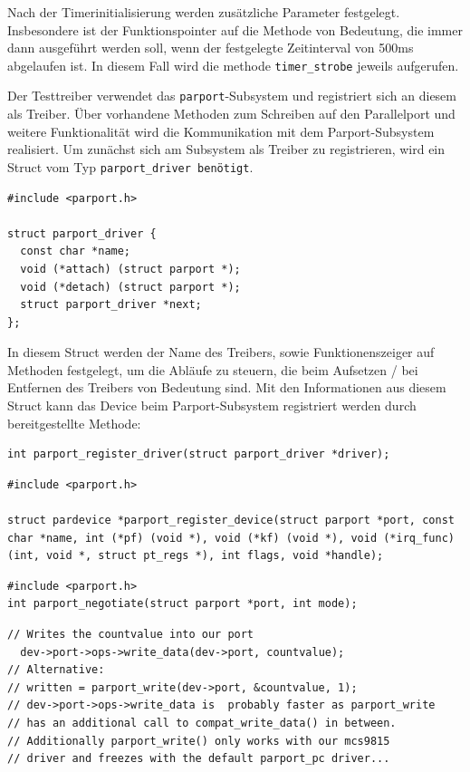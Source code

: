 \documentclass[a4paper,11pt]{article}
\begin{document}
Nach der Timerinitialisierung werden zusätzliche Parameter festgelegt. Insbesondere ist der Funktionspointer auf die Methode von Bedeutung, die immer dann ausgeführt werden soll, wenn der festgelegte Zeitinterval von 500ms abgelaufen ist. In diesem Fall wird die methode \verb|timer_strobe| jeweils aufgerufen.

Der Testtreiber verwendet das \verb|parport|-Subsystem und registriert sich an diesem als Treiber. Über vorhandene Methoden zum Schreiben auf den Parallelport und weitere Funktionalität wird die Kommunikation mit dem Parport-Subsystem realisiert. Um zunächst sich am Subsystem als Treiber zu registrieren, wird ein Struct vom Typ \verb|parport_driver benötigt|.

\begin{verbatim}
#include <parport.h>

struct parport_driver {
  const char *name;
  void (*attach) (struct parport *);
  void (*detach) (struct parport *);
  struct parport_driver *next;
};
\end{verbatim}

In diesem Struct werden der Name des Treibers, sowie Funktionenszeiger auf Methoden festgelegt, um die Abläufe zu steuern, die beim Aufsetzen / bei Entfernen des Treibers von Bedeutung sind. Mit den Informationen aus diesem Struct kann das Device beim Parport-Subsystem registriert werden durch bereitgestellte Methode:
\begin{verbatim}
int parport_register_driver(struct parport_driver *driver);
\end{verbatim}

\begin{verbatim}
#include <parport.h>

struct pardevice *parport_register_device(struct parport *port, const char *name, int (*pf) (void *), void (*kf) (void *), void (*irq_func) (int, void *, struct pt_regs *), int flags, void *handle);
\end{verbatim}

\begin{verbatim}
#include <parport.h>
int parport_negotiate(struct parport *port, int mode);
\end{verbatim}

\begin{verbatim}
// Writes the countvalue into our port
  dev->port->ops->write_data(dev->port, countvalue);
// Alternative:
// written = parport_write(dev->port, &countvalue, 1);
// dev->port->ops->write_data is  probably faster as parport_write 
// has an additional call to compat_write_data() in between. 
// Additionally parport_write() only works with our mcs9815 
// driver and freezes with the default parport_pc driver...
\end{verbatim}
\end{document}
